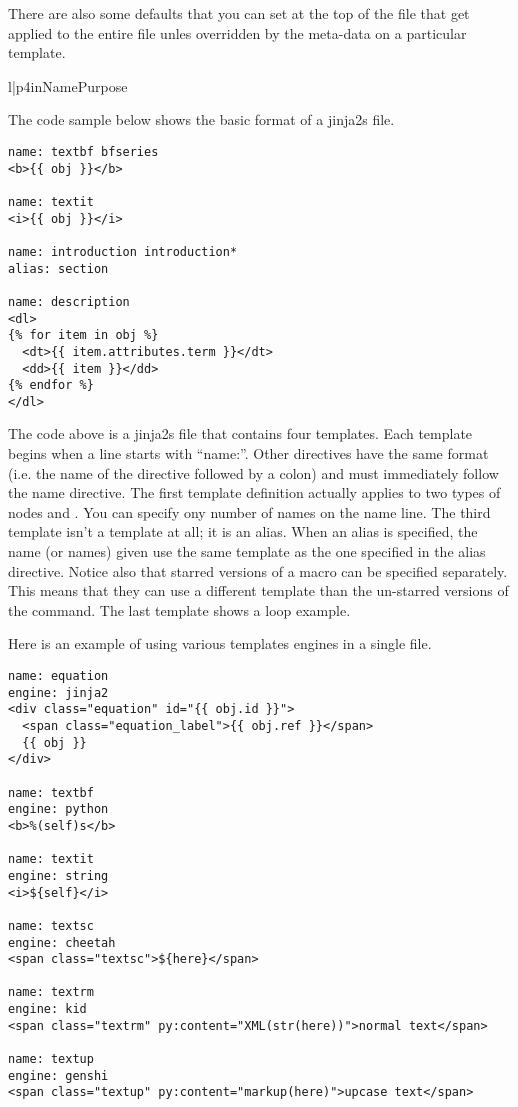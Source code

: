 There are also some defaults that you can set at the top of the file that
get applied to the entire file unles overridden by the meta-data on a
particular template.
\begin{tableii}{l|p{4in}}{}{Name}{Purpose}
\end{tableii}

The code sample below shows the basic format of a jinja2s file.
\begin{verbatim}
name: textbf bfseries
<b>{{ obj }}</b>

name: textit
<i>{{ obj }}</i>

name: introduction introduction*
alias: section

name: description
<dl>
{% for item in obj %}
  <dt>{{ item.attributes.term }}</dt>
  <dd>{{ item }}</dd>
{% endfor %}
</dl>
\end{verbatim}

The code above is a jinja2s file that contains four templates.  Each template
begins when a line starts with ``name:''.  Other directives have the same
format (i.e. the name of the directive followed by a colon) and must
immediately follow the name directive.  The first template definition
actually applies to two types of nodes  and .
You can specify ony number of names on the name line.  The third template
isn't a template at all; it is an alias.  When an alias is specified,
the name (or names) given use the same template as the one specified
in the alias directive. Notice also that starred versions of a macro
can be specified separately. This means that they can use a different
template than the un-starred versions of the command.
The last template shows a loop example.

Here is an example of using various templates engines in a single file.
\begin{verbatim}
name: equation
engine: jinja2
<div class="equation" id="{{ obj.id }}">
  <span class="equation_label">{{ obj.ref }}</span>
  {{ obj }}
</div>

name: textbf
engine: python
<b>%(self)s</b>

name: textit
engine: string
<i>${self}</i>

name: textsc
engine: cheetah
<span class="textsc">${here}</span>

name: textrm
engine: kid
<span class="textrm" py:content="XML(str(here))">normal text</span>

name: textup
engine: genshi
<span class="textup" py:content="markup(here)">upcase text</span>
\end{verbatim}

